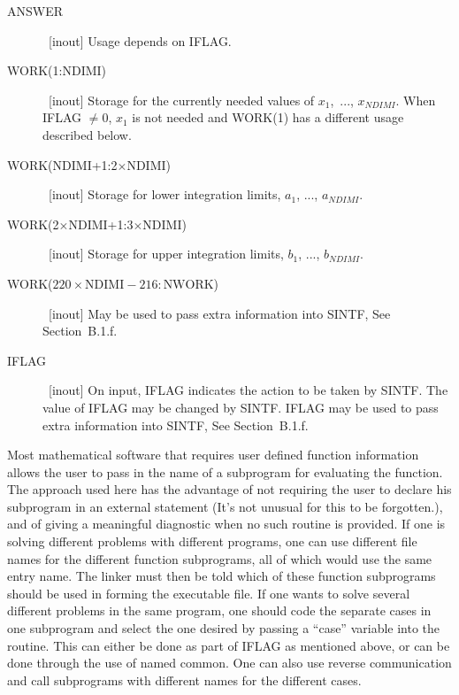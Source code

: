 \documentclass[twoside]{MATH77}
\begin{document}
\begin{description}
\item[ANSWER] \  [inout] Usage depends on IFLAG.

\item[WORK({\rm 1:NDIMI})]  \ [inout] Storage for the currently needed
values of $x_1$,\ ..., $x_{NDIMI}$. When IFLAG $\neq 0$, $x_1$ is not
needed and WORK(1) has a different usage described below.

\item[WORK({\rm NDIMI+1:2$\times $NDIMI})]  \ [inout] Storage for
lower integration limits, $a_1$, ..., $a_{NDIMI}.$

\item[WORK({\rm 2$\times $NDIMI+1:3$\times $NDIMI)}]  \ [inout]
Storage for upper integration limits, $b_1$, ..., $b_{NDIMI}.$

\item[WORK({\rm $220\times \text{NDIMI}-216:\text{NWORK}$})] \ [inout]
May be used to pass extra information into SINTF, See Section~B.1.f.

\item[IFLAG] \ [inout] On input, IFLAG indicates the action to be taken by
SINTF.  The value of IFLAG may be changed by SINTF.  IFLAG may be used to
pass extra information into SINTF, See Section~B.1.f.

\end{description}

Most mathematical software that requires user defined function
information allows the user to pass in the name of a subprogram for
evaluating the function.  The approach used here has the advantage of not
requiring the user to declare his subprogram in an external statement
(It's not unusual for this to be forgotten.), and of giving a meaningful
diagnostic when no such routine is provided.  If one is solving different
problems with different programs, one can use different file names for the
different function subprograms, all of which would use the same entry
name.  The linker must then be told which of these function subprograms
should be used in forming the executable file.  If one wants to solve
several different problems in the same program, one should code the
separate cases in one subprogram and select the one desired by passing a
``case'' variable into the routine.  This can either be done as part of
IFLAG as mentioned above, or can be done through the use of named
common.  One can also use reverse communication and call subprograms with
different names for the different cases.
\end{document}
